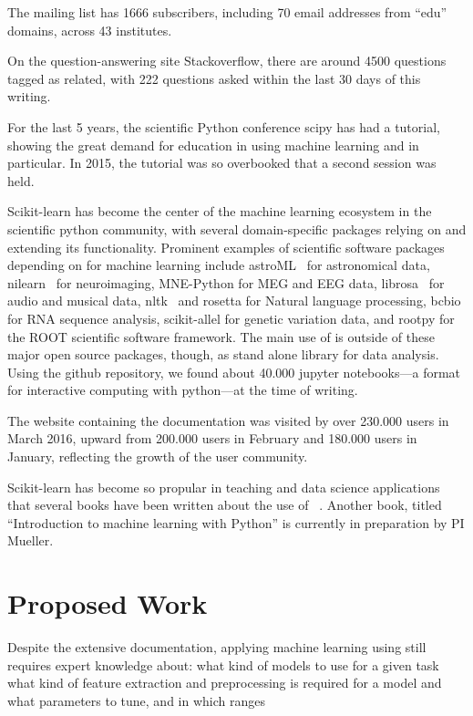 The \sklearn{} mailing list has 1666 subscribers, including 70 email
addresses from ``edu'' domains, across 43 institutes.

On the question-answering site Stackoverflow, there are around 4500 questions
tagged as \sklearn{} related, with 222 questions asked within the last 30
days of this writing.

For the last 5 years, the scientific Python conference scipy has had a \sklearn{} tutorial,
showing the great demand for education in using machine learning and \sklearn{} in particular.
In 2015, the tutorial was so overbooked that a second session was held.

Scikit-learn has become the center of the machine learning ecosystem in the scientific python community,
with several domain-specific packages relying on and extending its functionality.
Prominent examples of scientific software packages depending on \sklearn{}
for machine learning include astroML~\autocite{van2013openml} for astronomical
data, nilearn~\autocite{abraham2014machine} for neuroimaging, MNE-Python for MEG
and EEG data, librosa~\autocite{mcfee2015librosa} for audio and musical data,
nltk~\autocite{bird2006nltk} and rosetta for Natural language processing, bcbio for
RNA sequence analysis, scikit-allel for genetic variation data, and rootpy for
the ROOT scientific software framework.
The main use of \sklearn{} is outside of these major open source packages, though,
as stand alone library for data analysis. Using the github repository, we found
about 40.000 jupyter notebooks---a format for interactive computing with python---at the time of writing.

The \sklearn{} website containing the documentation was visited by over
230.000 users in March 2016, upward from 200.000 users in February and 180.000 users in January,
reflecting the growth of the \sklearn{} user community.

Scikit-learn has become so propular in teaching and data science applications that
several books have been written about the use of
\sklearn{}~\autocite{garreta2013learning, hackeling2014mastering,
hauck2014scikit, raschka2015python}. Another book, titled ``Introduction to
machine learning with Python'' is currently in preparation by PI Mueller.

\section{Proposed Work}
Despite the extensive documentation, applying machine learning using \sklearn{}
still requires expert knowledge about:
what kind of models to use for a given task
what kind of feature extraction and preprocessing is required for a model
and what parameters to tune, and in which ranges

